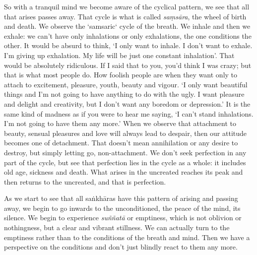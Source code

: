 So with a tranquil mind we become aware of the cyclical pattern, we see that all that arises passes away. That cycle is what is called \textit{sa\d{m}s\=ara}, the wheel of birth and death. We observe the `samsaric` cycle of the breath. We inhale and then we exhale: we can't have only inhalations or only exhalations, the one conditions the other. It would be absurd to think, `I only want to inhale. I don't want to exhale. I'm giving up exhalation. My life will be just one constant inhalation'. That would be absolutely ridiculous. If I said that to you, you'd think I was crazy; but that is what most people do. How foolish people are when they want only to attach to excitement, pleasure, youth, beauty and vigour. `I only want beautiful things and I'm not going to have anything to do with the ugly. I want pleasure and delight and creativity, but I don't want any boredom or depression.' It is the same kind of madness as if you were to hear me saying, `I can't stand inhalations. I'm not going to have them any more.' When we observe that attachment to beauty, sensual pleasures and love will always lead to despair, then our attitude becomes one of detachment. That doesn't mean annihilation or any desire to destroy, but simply letting go, non-attachment. We don't seek perfection in any part of the cycle, but see that perfection lies in the cycle as a whole: it includes old age, sickness and death. What arises in the uncreated reaches its peak and then returns to the uncreated, and that is perfection.

As we start to see that all sa\.nkh\=aras have this pattern of arising and passing away, we begin to go inwards to the unconditioned, the peace of the mind, its silence. We begin to experience \textit{su\~n\~nat\=a} or emptiness, which is not oblivion or nothingness, but a clear and vibrant stillness. We can actually turn to the emptiness rather than to the conditions of the breath and mind. Then we have a perspective on the conditions and don't just blindly react to them any more.

